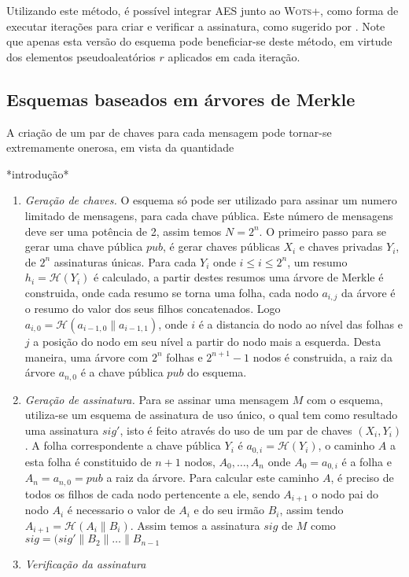 \documentclass{article}
\begin{document}
Utilizando este método, é possível integrar AES junto ao \textsc{Wots+}, como forma de executar iterações para criar e verificar a assinatura, como sugerido por \cite[4.1]{cryptoeprint:2017:965}. Note que apenas esta versão do esquema pode beneficiar-se deste método, em virtude dos elementos pseudoaleatórios $r$ aplicados em cada iteração.

\subsection{Esquemas baseados em árvores de Merkle}

A criação de um par de chaves para cada mensagem pode tornar-se extremamente onerosa, em vista da quantidade

*introdução*

\begin{enumerate}
    \item[] \emph{Geração de chaves.} O esquema só pode ser utilizado para assinar um numero limitado de mensagens, para cada chave pública. Este número de mensagens deve ser uma potência de 2, assim temos $N = 2^{n}$. O primeiro passo para se gerar uma chave pública $pub$, é gerar chaves públicas $X_i$ e chaves privadas $Y_i$, de $2^{n}$ assinaturas únicas. Para cada $Y_i$ onde $i\leq i\leq 2^{n}$, um resumo $h_i=\mathcal{H}(Y_i)$ é calculado, a partir destes resumos uma árvore de Merkle é construida, onde cada resumo se torna uma folha, cada nodo $a_{i,j}$ da árvore é o resumo do valor dos seus filhos concatenados. Logo $a_{i,0}=\mathcal{H}(a_{i-1,0}\parallel a_{i-1,1})$, onde $i$ é a distancia do nodo ao nível das folhas e $j$ a posição do nodo em seu nível a partir do nodo mais a esquerda. Desta maneira, uma árvore com $2^{n}$ folhas e $2^{n+1}-1$ nodos é construida, a raiz da árvore $a_{n,0}$ é a chave pública $pub$ do esquema.

    \item[] \emph{Geração de assinatura.} Para se assinar uma mensagem $M$ com o esquema, utiliza-se um esquema de assinatura de uso único, o qual tem como resultado uma assinatura $sig'$, isto é feito através do uso de um par de chaves $(X_{i},Y_{i})$. A folha correspondente a chave pública $Y_i$ é $a_{0,i}=\mathcal{H}(Y_i)$, o caminho $A$ a esta folha é constituido de $n+1$ nodos, $A_{0},\dots,A_n$ onde $A_{0}=a_{0,i}$ é a folha e $A_{n}=a_{n,0}=pub$ a raiz da árvore. Para calcular este caminho $A$, é preciso de todos os filhos de cada nodo pertencente a ele, sendo $A_{i+1}$ o nodo pai do nodo $A_i$ é necessario o valor de $A_i$ e do seu irmão $B_i$, assim tendo $A_{i+1}=\mathcal{H}(A_i\parallel B_i)$. Assim temos a assinatura $sig$ de $M$ como $sig=(sig'\parallel B_2\parallel\dots\parallel B_{n-1}$



    \item[] \emph{Verificação da assinatura}
\end{enumerate}


 
\end{document}
